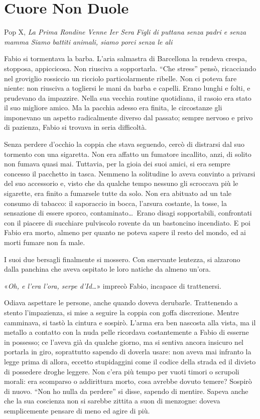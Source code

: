 \chapter{Cuore Non Duole}

\begin{chapquote}{Pop X, \textit{La Prima Rondine Venne Ier Sera}}
	\textit{Figli di puttana senza padri e senza mamma\newline
		Siamo battiti animali, siamo porci senza le ali
	}
\end{chapquote}

Fabio si tormentava la barba. L'aria salmastra di Barcellona la rendeva crespa, stopposa, appiccicosa. Non riusciva a sopportarla. ``Che stress'' pensò, ricacciando nel groviglio rossiccio un ricciolo particolarmente ribelle. Non ci poteva fare niente: non riusciva a togliersi le mani da barba e capelli. Erano lunghi e folti, e prudevano da impazzire. Nella sua vecchia routine quotidiana, il rasoio era stato il suo migliore amico. Ma la pacchia adesso era finita, le circostanze gli imponevano un aspetto radicalmente diverso dal passato; sempre nervoso e privo di pazienza, Fabio si trovava in seria difficoltà.

Senza perdere d'occhio la coppia che stava seguendo, cercò di distrarsi dal suo tormento con una sigaretta. Non era affatto un fumatore incallito, anzi, di solito non fumava quasi mai. Tuttavia, per la gioia dei suoi amici, si era sempre concesso il pacchetto in tasca. Nemmeno la solitudine lo aveva convinto a privarsi del suo accessorio e, visto che da qualche tempo nessuno gli scroccava più le sigarette, era finito a fumarsele tutte da solo. Non era abituato ad un tale consumo di tabacco: il saporaccio in bocca, l'arsura costante, la tosse, la sensazione di essere sporco, contaminato\ldots\ Erano disagi sopportabili, confrontati con il piacere di succhiare pulviscolo rovente da un bastoncino incendiato. E poi Fabio era morto, almeno per quanto ne poteva sapere il resto del mondo, ed ai morti fumare non fa male.

I suoi due bersagli finalmente si mossero. Con snervante lentezza, si alzarono dalla panchina che aveva ospitato le loro natiche da almeno un'ora.

«\textit{Oh, e l'era l'ora, serpe d'Id\ldots}» imprecò Fabio, incapace di trattenersi.

Odiava aspettare le persone, anche quando doveva derubarle. Trattenendo a stento l'impazienza, si mise a seguire la coppia con goffa discrezione. Mentre camminava, si tastò la cintura e sospirò. L'arma era ben nascosta alla vista, ma il metallo a contatto con la nuda pelle ricordava costantemente a Fabio di esserne in possesso; ce l'aveva già da qualche giorno, ma si sentiva ancora insicuro nel portarla in giro, soprattutto sapendo di doverla usare: non aveva mai infranto la legge prima di allora, eccetto stupidaggini come il codice della strada ed il divieto di possedere droghe leggere. Non c'era più tempo per vuoti timori o scrupoli morali: era scomparso o addirittura morto, cosa avrebbe dovuto temere? Sospirò di nuovo. ``Non ho nulla da perdere'' si disse, sapendo di mentire. Sapeva anche che la sua coscienza non si sarebbe zittita a suon di menzogne: doveva semplicemente pensare di meno ed agire di più.

